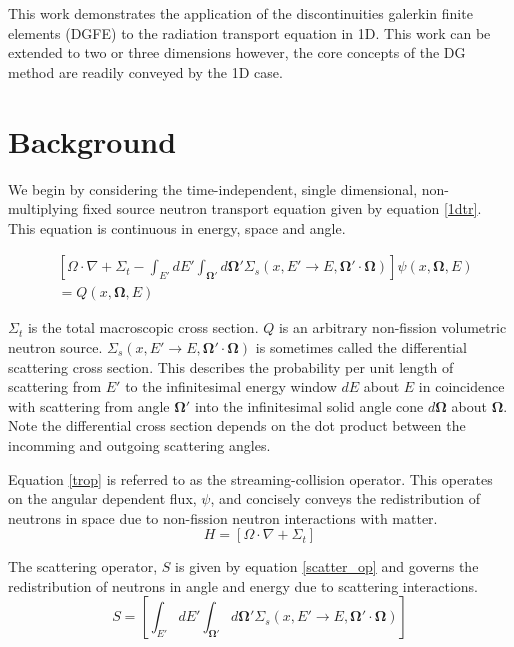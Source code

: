 This work demonstrates the application of the discontinuities galerkin finite elements (DGFE)
to the radiation transport equation in 1D.  This work can be extended to two or
three dimensions however, the core concepts of the DG method are readily conveyed by the 1D case.

\section{Background}

We begin by considering the time-independent, single dimensional, non-multiplying fixed source neutron transport equation given by equation \ref{1dtr}.  This equation is continuous in energy, space and angle.

\begin{eqnarray}
& \left[ \Omega \cdot \nabla + \Sigma_t -
\int_{E'} dE' \int_{\mathbf\Omega'} d \mathbf\Omega'
\Sigma_s \left(x, E' \rightarrow E , \mathbf\Omega' \cdot \mathbf\Omega \right) \right] 
\psi(x, \mathbf\Omega, E)  \nonumber \\
& =
Q(x, \mathbf\Omega, E)
\label{1dtr}
\end{eqnarray}

$\Sigma_t$ is the total macroscopic cross section.  $Q$ is an arbitrary non-fission volumetric neutron source. 
$\Sigma_s \left(x, E' \rightarrow E , \mathbf\Omega' \cdot \mathbf\Omega \right)$ is sometimes called the differential scattering cross section.  This describes the probability per unit length of scattering from $E'$ to the infinitesimal energy window $dE$ about $E$ in coincidence with scattering from angle $\mathbf\Omega'$ into the infinitesimal solid angle cone $d\mathbf\Omega$ about $\mathbf\Omega$.  Note the differential cross section depends on the dot product between the incomming and outgoing scattering angles.  

Equation \ref{trop} is referred to as the streaming-collision operator.  This operates on the angular dependent flux, $\psi$, and concisely conveys the redistribution of neutrons in space due to non-fission neutron interactions with matter.
\begin{equation}
H = \left[ \Omega \cdot \nabla + \Sigma_t 
 \right]
\label{trop}
\end{equation}

The scattering operator, $S$ is given by equation \ref{scatter_op} and governs the redistribution of neutrons in angle and energy due to scattering interactions.
\begin{equation}
S = \left[ 
\int_{E'} dE' \int_{\mathbf\Omega'} d \mathbf\Omega'
\Sigma_s \left(x, E' \rightarrow E , \mathbf\Omega' \cdot \mathbf\Omega \right)
 \right]
\label{scatter_op}
\end{equation}

